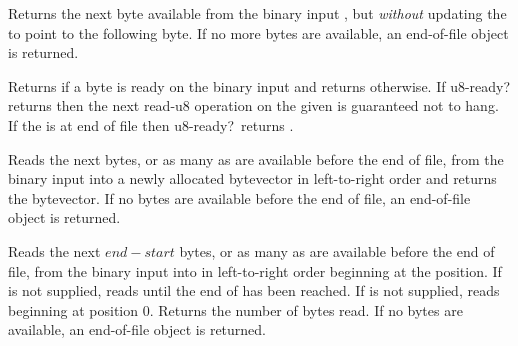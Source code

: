 \begin{entry}{
}

Returns the next byte available from the binary input ,
but {\em without} updating the  to point to the following
byte.  If no more bytes are available, an end-of-file object is returned.

\end{entry}

\begin{entry}{
}

Returns \schtrue{} if a byte is ready on the binary input 
and returns \schfalse{} otherwise.  If {\cf u8-ready?} returns
\schtrue{} then the next {\cf read-u8} operation on the given
 is guaranteed not to hang.  If the  is at end of
file then {\cf u8-ready?}\ returns \schtrue.

\end{entry}

\begin{entry}{
}

Reads the next  bytes, or as many as are available before the end of file,
from the binary
input  into a newly allocated bytevector in left-to-right order
and returns the bytevector.
If no bytes are available before the end of file,
an end-of-file object is returned.

\end{entry}

\begin{entry}{
}

Reads the next $end - start$ bytes, or as many as are available
before the end of file,
from the binary
input  into  in left-to-right order
beginning at the  position.  If  is not supplied,
reads until the end of  has been reached.  If
 is not supplied, reads beginning at position 0.
Returns the number of bytes read.
If no bytes are available, an end-of-file object is returned.

\end{entry}


